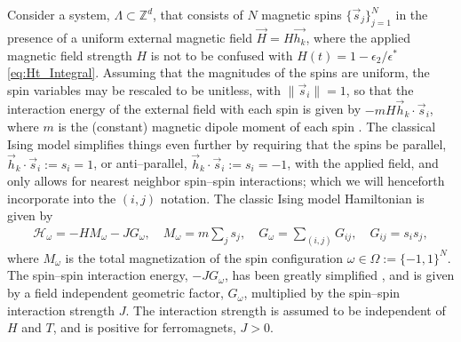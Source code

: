 \documentclass[english,12pt]{ttuthes}
\newcommand{\Hc}{\mathcal{H}}
\begin{document}
Consider a system, $\Lambda\subset\mathbb{Z}^d$, that consists of $N$ magnetic spins 
$\{\vec{s}_j\}_{j=1}^N$ in the presence of a uniform external magnetic field
$\vec{H}=H\vec{h_k}$, where the applied magnetic field strength $H$ is
not to be confused with $H(t)=1-\epsilon_2/\epsilon^*$
\eqref{eq:Ht_Integral}. Assuming that the magnitudes of the spins are
uniform, the spin variables may be rescaled to be unitless, with
$\|\vec{s}_i\|=1$, so that the interaction energy of the external field
with each spin is given by $-mH\vec{h}_k\cdot\vec{s}_i$, where $m$ is the
(constant) magnetic dipole moment of each spin
\cite{Griffiths-1999}. The classical Ising model simplifies things 
even further by requiring that the spins be parallel,
$\vec{h}_k\cdot\vec{s}_i:=s_i=1$, or anti--parallel,
$\vec{h}_k\cdot\vec{s}_i:=s_i=-1$, with the applied field, and only allows
for nearest neighbor spin--spin interactions; which we will henceforth
incorporate into the $(i,j)$ notation. The classic Ising model
Hamiltonian is given by
\cite{Christensen-2005,Chandler-1987,Robertson-1993,Thompson-1988}    
%
\begin{align}\label{eq:Ising_Model_Hamiltonian}
  \Hc_\omega=-HM_\omega -JG_\omega, \quad M_\omega =m\sum_js_j, \quad G_\omega=\sum_{(i,j)}G_{ij}, \quad G_{ij}=s_is_j,
\end{align}
%
where $M_\omega$ is the total magnetization of the spin
configuration $\omega\in\Omega:=\{-1,1\}^N$. The spin--spin interaction energy,
$-JG_\omega$, has been greatly simplified \cite{Griffiths-1999}, and is
given by a field independent geometric factor, $G_\omega$, multiplied by
the spin--spin interaction strength $J$. The interaction strength is
assumed to be independent of $H$ and $T$, and is positive for
ferromagnets, $J>0$.    
\end{document}
